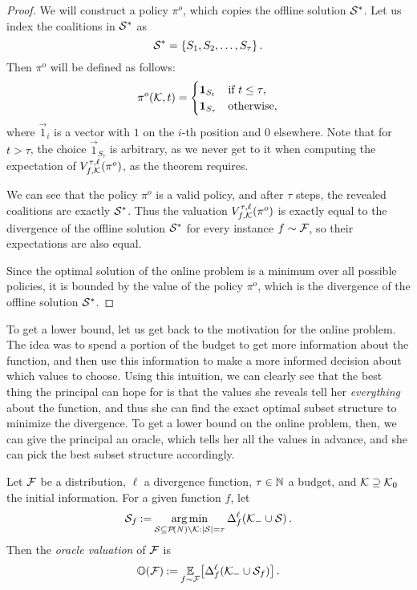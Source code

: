\begin{proof}
  We will construct a policy $ \pi^o $, which copies the offline solution $ \mathcal{S}^* $.
  Let us index the coalitions in $ \mathcal{S}^* $ as \[
    \mathcal{S}^* = \left\{ S_1, S_2, \ldots, S_\tau \right\}.
  \]
  Then $ \pi^o $ will be defined as follows: \[
    \pi^o\!\left(\mathcal{K}, t\right) = \begin{cases}
      \boldsymbol 1_{S_t} & \text{if } t \leq \tau, \\
      \boldsymbol 1_{S_\tau} & \text{otherwise,}
    \end{cases}
  \]
  where $ \vec 1_i $ is a vector with $ 1 $ on the $ i $-th position and $ 0 $ elsewhere.
  Note that for $ t > \tau $, the choice $ \vec 1_{S_\tau} $ is arbitrary, as we never get to it when computing the expectation of $ V^{\tau,\ell}_{f,\mathcal{K}}\!\left(\pi^o\right) $, as the theorem requires.

  We can see that the policy $ \pi^o $ is a valid policy, and after $ \tau $ steps, the revealed coalitions are exactly $ \mathcal{S}^* $.
  Thus the valuation $ V^{\tau,\ell}_{f,\mathcal{K}}\!\left(\pi^o\right) $ is exactly equal to the divergence of the offline solution $ \mathcal{S}^* $ for every instance $ f \sim \mathcal{F} $, so their expectations are also equal.

  Since the optimal solution of the online problem is a minimum over all possible policies, it is bounded by the value of the policy $ \pi^o $, which is the divergence of the offline solution $ \mathcal{S}^* $.
\end{proof}

To get a lower bound, let us get back to the motivation for the online problem.
The idea was to spend a portion of the budget to get more information about the function, and then use this information to make a more informed decision about which values to choose.
Using this intuition, we can clearly see that the best thing the principal can hope for is that the values she reveals tell her \emph{everything} about the function, and thus she can find the exact optimal subset structure to minimize the divergence.
To get a lower bound on the online problem, then, we can give the principal an oracle, which tells her all the values in advance, and she can pick the best subset structure accordingly.

\begin{defi}
  \label{def:oracle-valuation}
  Let $ \mathcal{F} $ be a distribution, $ \ell $ a divergence function, $ \tau \in \mathbb{N} $ a budget, and $ \mathcal{K} \supseteq \mathcal{K}_0 $ the initial information.
  For a given function $ f $, let \begin{equation}\label{eq:def-sf}
    \mathcal{S}_f \mathbin{:=} \operatorname*{arg\,min}_{\mathcal{S} \subseteq \mathcal{P}\!\left(N\right) \setminus \mathcal{K}: \left\lvert \mathcal{S} \right\rvert = \tau} \Delta_{f}^{\ell}\!\left(\mathcal{K}_- \cup \mathcal{S}\right).
  \end{equation}
  Then the \emph{oracle valuation} of $ \mathcal{F} $ is \[
    \mathbb O\!\left(\mathcal{F}\right) \mathbin{:=} \operatorname*{\mathbb{E}}_{f \sim \mathcal{F}}\!\left[ \Delta_{f}^{\ell}\!\left(\mathcal{K}_- \cup \mathcal{S}_f\right) \right].
  \]
\end{defi}

